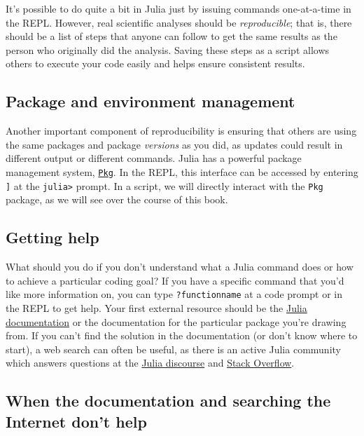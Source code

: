 \documentclass[
  11pt,
]{book}
\begin{document}
It's possible to do quite a bit in Julia just by issuing commands one-at-a-time in the REPL. However, real scientific analyses should be \emph{reproducible}; that is, there should be a list of steps that anyone can follow to get the same results as the person who originally did the analysis. Saving these steps as a script allows others to execute your code easily and helps ensure consistent results.

\hypertarget{package-and-environment-management}{%
\subsection{Package and environment management}\label{package-and-environment-management}}

Another important component of reproducibility is ensuring that others are using the same packages and package \emph{versions} as you did, as updates could result in different output or different commands. Julia has a powerful package management system, \href{https://docs.julialang.org/en/v1/stdlib/Pkg/}{\texttt{Pkg}}. In the REPL, this interface can be accessed by entering \texttt{{]}} at the \texttt{julia\textgreater{}} prompt. In a script, we will directly interact with the \texttt{Pkg} package, as we will see over the course of this book.

\hypertarget{getting-help}{%
\subsection{Getting help}\label{getting-help}}

What should you do if you don't understand what a Julia command does or how to achieve a particular coding goal? If you have a specific command that you'd like more information on, you can type \texttt{?functionname} at a code prompt or in the REPL to get help. Your first external resource should be the \href{https://docs.julialang.org/en/v1/}{Julia documentation} or the documentation for the particular package you're drawing from. If you can't find the solution in the documentation (or don't know where to start), a web search can often be useful, as there is an active Julia community which answers questions at the \href{https://discourse.julialang.org/}{Julia discourse} and \href{https://stackoverflow.com/}{Stack Overflow}.

\hypertarget{when-the-documentation-and-searching-the-internet-dont-help}{%
\subsection{When the documentation and searching the Internet don't help}\label{when-the-documentation-and-searching-the-internet-dont-help}}
\end{document}
